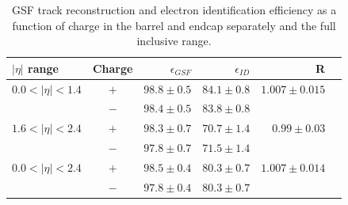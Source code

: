 \begin{table}[htbp]
\begin{center}
\begin{tabular}{lcrrrr}
\toprule
$|\eta|$ range & Charge & $\epsilon_{GSF}$ &$\epsilon_{ID}$& R\\
\midrule
$0.0<| \eta |<1.4$ &$+$& $98.8\pm0.5$ &$84.1\pm0.8$ & $1.007\pm0.015$\\
                   &$-$& $98.4\pm0.5$ &$83.8\pm0.8$ & \\
$1.6<| \eta |<2.4$ &$+$& $98.3\pm0.7$ &$70.7\pm1.4$ & $0.99\pm0.03$\\
                   &$-$& $97.8\pm0.7$ &$71.5\pm1.4$ & \\
\midrule
$0.0<| \eta |<2.4$ &$+$& $98.5\pm0.4$ &$80.3\pm0.7$ & $1.007\pm0.014$\\
                   &$-$& $97.8\pm0.4$ &$80.3\pm0.7$ & \\
\bottomrule
\end{tabular}
\end{center}
\caption[GSF track reconstruction and electron identification efficiency as a
function of charge.]{GSF track reconstruction and
electron identification efficiency as a function of charge in the barrel and endcap
separately and the full inclusive range\cite{baisini2010electron}.}
\label{tab:tagprobe}
\end{table}

